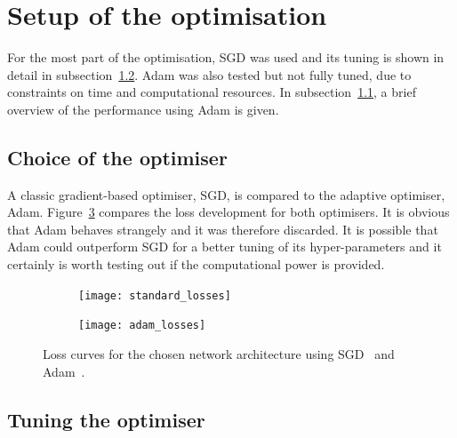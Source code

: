 \section{Setup of the optimisation}

For the most part of the optimisation, SGD was used and its tuning is shown in detail in subsection~\ref{sec:optimiser:tuning}.
Adam was also tested but not fully tuned, due to constraints on time and computational resources.
In subsection~\ref{sec:optimiser:choice}, a brief overview of the performance using Adam is given.

\subsection{Choice of the optimiser}
\label{sec:optimiser:choice}

A classic gradient-based optimiser, SGD, is compared to the adaptive optimiser, Adam. Figure~\ref{fig:opti} compares the loss development for both optimisers. It is obvious that Adam behaves strangely and it was therefore discarded. It is possible that Adam could outperform SGD for a better tuning of its hyper-parameters and it certainly is worth testing out if the computational power is provided.

\begin{figure}[htbp]
    \centering
    \begin{subfigure}[b]{0.48\textwidth}
        \texttt{[image: standard\_losses]}
        \caption{}
        \label{fig:opti:standard}
    \end{subfigure}
\quad
    \begin{subfigure}[b]{0.48\textwidth}
        \texttt{[image: adam\_losses]}
        \caption{}
        \label{fig:opti:adam}
    \end{subfigure}
    \caption[Classifier losses for different optimisers]{Loss curves for the chosen network architecture using SGD~ and Adam~.}
	\label{fig:opti}
\end{figure}

\subsection{Tuning the optimiser}
\label{sec:optimiser:tuning}


